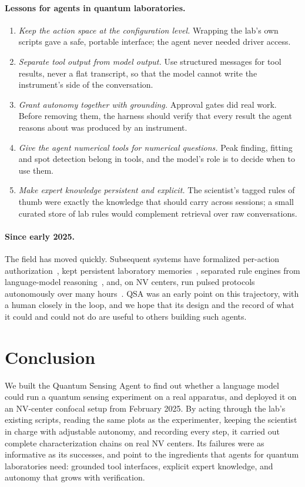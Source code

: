 \documentclass[10pt]{article}
\newcommand{\qsa}{QSA}
\begin{document}
\paragraph{Lessons for agents in quantum laboratories.}
\begin{enumerate}[leftmargin=*]
  \item \emph{Keep the action space at the configuration level.} Wrapping the lab's own scripts gave a safe, portable interface; the agent never needed driver access.
  \item \emph{Separate tool output from model output.} Use structured messages for tool results, never a flat transcript, so that the model cannot write the instrument's side of the conversation.
  \item \emph{Grant autonomy together with grounding.} Approval gates did real work. Before removing them, the harness should verify that every result the agent reasons about was produced by an instrument.
  \item \emph{Give the agent numerical tools for numerical questions.} Peak finding, fitting and spot detection belong in tools, and the model's role is to decide when to use them.
  \item \emph{Make expert knowledge persistent and explicit.} The scientist's tagged rules of thumb were exactly the knowledge that should carry across sessions; a small curated store of lab rules would complement retrieval over raw conversations.
\end{enumerate}

\paragraph{Since early 2025.}
The field has moved quickly.
Subsequent systems have formalized per-action authorization~\cite{wang2026artiq}, kept persistent laboratory memories~\cite{sha2025qcopilot,vriza2025learnonjob}, separated rule engines from language-model reasoning~\cite{fan2026qmclaw}, and, on NV centers, run pulsed protocols autonomously over many hours~\cite{isogawa2026nv}.
\qsa{} was an early point on this trajectory, with a human closely in the loop, and we hope that its design and the record of what it could and could not do are useful to others building such agents.

\section{Conclusion}
We built the Quantum Sensing Agent to find out whether a language model could run a quantum sensing experiment on a real apparatus, and deployed it on an NV-center confocal setup from February 2025.
By acting through the lab's existing scripts, reading the same plots as the experimenter, keeping the scientist in charge with adjustable autonomy, and recording every step, it carried out complete characterization chains on real NV centers.
Its failures were as informative as its successes, and point to the ingredients that agents for quantum laboratories need: grounded tool interfaces, explicit expert knowledge, and autonomy that grows with verification.
\end{document}
